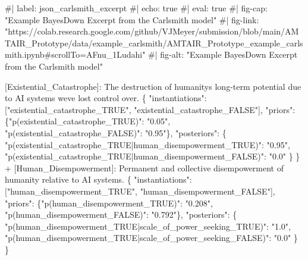\documentclass[
  11pt,
  letterpaper,
]{book}
\newenvironment{Shaded}{\begin{snugshade}}{\end{snugshade}}
\newcommand{\DataTypeTok}[1]{\textcolor[rgb]{0.68,0.00,0.00}{#1}}
\newcommand{\ErrorTok}[1]{\textcolor[rgb]{0.68,0.00,0.00}{#1}}
\newcommand{\FunctionTok}[1]{\textcolor[rgb]{0.28,0.35,0.67}{#1}}
\newcommand{\OtherTok}[1]{\textcolor[rgb]{0.00,0.23,0.31}{#1}}
\newcommand{\StringTok}[1]{\textcolor[rgb]{0.13,0.47,0.30}{#1}}
\begin{document}
\begin{landscape}
\begin{Shaded}
\begin{Highlighting}[]
\ErrorTok{\#|} \ErrorTok{label:} \ErrorTok{json\_carlsmith\_excerpt}
\ErrorTok{\#|} \ErrorTok{echo:} \ErrorTok{true}
\ErrorTok{\#|} \ErrorTok{eval:} \ErrorTok{true}
\ErrorTok{\#|} \ErrorTok{fig{-}cap:} \ErrorTok{"Example} \ErrorTok{BayesDown} \ErrorTok{Excerpt} \ErrorTok{from} \ErrorTok{the} \ErrorTok{Carlsmith} \ErrorTok{model"}
\ErrorTok{\#|} \ErrorTok{fig{-}link:} \ErrorTok{"https://colab.research.google.com/github/VJMeyer/submission/blob/main/AMTAIR\_Prototype/data/example\_carlsmith/AMTAIR\_Prototype\_example\_carlsmith.ipynb\#scrollTo=AFnu\_1Ludahi"}
\ErrorTok{\#|} \ErrorTok{fig{-}alt:} \ErrorTok{"Example} \ErrorTok{BayesDown} \ErrorTok{Excerpt} \ErrorTok{from} \ErrorTok{the} \ErrorTok{Carlsmith} \ErrorTok{model"}



\OtherTok{[}\ErrorTok{Existential\_Catastrophe}\OtherTok{]}\ErrorTok{:} \ErrorTok{The} \ErrorTok{destruction} \ErrorTok{of} \ErrorTok{humanity\textquotesingle{}s} \ErrorTok{long{-}term} \ErrorTok{potential} \ErrorTok{due} \ErrorTok{to} \ErrorTok{AI} \ErrorTok{systems} \ErrorTok{we\textquotesingle{}ve} \ErrorTok{lost} \ErrorTok{control} \ErrorTok{over.} \FunctionTok{\{}
  \DataTypeTok{"instantiations"}\FunctionTok{:} \OtherTok{[}\StringTok{"existential\_catastrophe\_TRUE"}\OtherTok{,} \StringTok{"existential\_catastrophe\_FALSE"}\OtherTok{]}\FunctionTok{,}
  \DataTypeTok{"priors"}\FunctionTok{:} \FunctionTok{\{}\DataTypeTok{"p(existential\_catastrophe\_TRUE)"}\FunctionTok{:} \StringTok{"0.05"}\FunctionTok{,} \DataTypeTok{"p(existential\_catastrophe\_FALSE)"}\FunctionTok{:} \StringTok{"0.95"}\FunctionTok{\},}
  \DataTypeTok{"posteriors"}\FunctionTok{:} \FunctionTok{\{}
    \DataTypeTok{"p(existential\_catastrophe\_TRUE|human\_disempowerment\_TRUE)"}\FunctionTok{:} \StringTok{"0.95"}\FunctionTok{,}
    \DataTypeTok{"p(existential\_catastrophe\_TRUE|human\_disempowerment\_FALSE)"}\FunctionTok{:} \StringTok{"0.0"}
  \FunctionTok{\}}
\FunctionTok{\}}
 \ErrorTok{+} \OtherTok{[}\ErrorTok{Human\_Disempowerment}\OtherTok{]}\ErrorTok{:} \ErrorTok{Permanent} \ErrorTok{and} \ErrorTok{collective} \ErrorTok{disempowerment} \ErrorTok{of} \ErrorTok{humanity} \ErrorTok{relative} \ErrorTok{to} \ErrorTok{AI} \ErrorTok{systems.} \FunctionTok{\{}
   \DataTypeTok{"instantiations"}\FunctionTok{:} \OtherTok{[}\StringTok{"human\_disempowerment\_TRUE"}\OtherTok{,} \StringTok{"human\_disempowerment\_FALSE"}\OtherTok{]}\FunctionTok{,}
   \DataTypeTok{"priors"}\FunctionTok{:} \FunctionTok{\{}\DataTypeTok{"p(human\_disempowerment\_TRUE)"}\FunctionTok{:} \StringTok{"0.208"}\FunctionTok{,} \DataTypeTok{"p(human\_disempowerment\_FALSE)"}\FunctionTok{:} \StringTok{"0.792"}\FunctionTok{\},}
   \DataTypeTok{"posteriors"}\FunctionTok{:} \FunctionTok{\{}
     \DataTypeTok{"p(human\_disempowerment\_TRUE|scale\_of\_power\_seeking\_TRUE)"}\FunctionTok{:} \StringTok{"1.0"}\FunctionTok{,}
     \DataTypeTok{"p(human\_disempowerment\_TRUE|scale\_of\_power\_seeking\_FALSE)"}\FunctionTok{:} \StringTok{"0.0"}
   \FunctionTok{\}}
 \FunctionTok{\}}
\end{Highlighting}
\end{Shaded}


\end{landscape}
\end{document}
